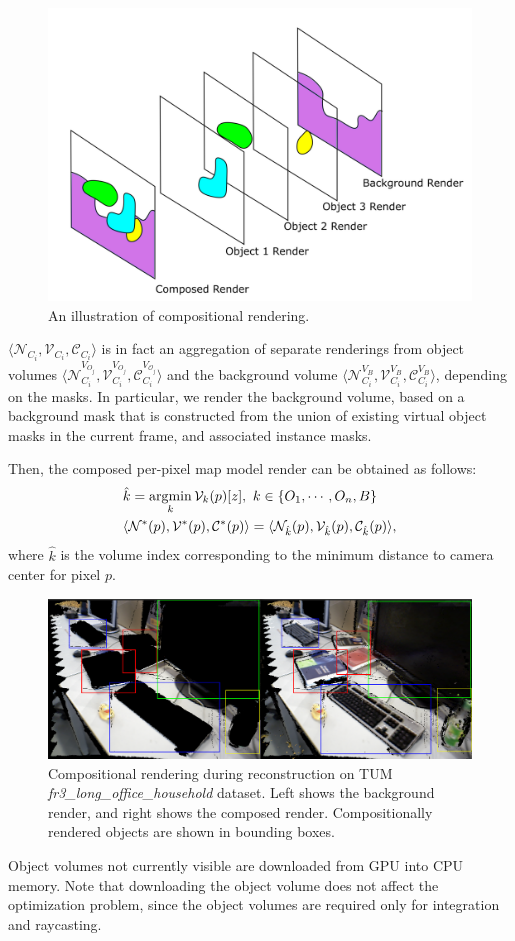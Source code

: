 \begin{figure}[htpb]
    \centering
    \includegraphics[width=0.8\linewidth]{figs/comp-render.png}
    \caption{An illustration of compositional rendering.}%
    \label{fig:comp-render}
\end{figure}

\(\langle \mathcal{N}_{C_i}, \mathcal{V}_{C_i}, \mathcal{C}_{C_i} \rangle \) is in fact an aggregation of separate renderings from object volumes \(\langle \mathcal{N}_{C_i}^{V_{{O}_j}}, \mathcal{V}_{C_i}^{V_{{O}_j}}, \mathcal{C}_{C_i}^{V_{\mathcal{O}_j}} \rangle \) and the background volume \(\langle \mathcal{N}_{C_i}^{V_{B}}, \mathcal{V}_{C_i}^{V_{B}}, \mathcal{C}_{C_i}^{V_{{B}}}  \rangle \), depending on the masks. In particular, we render the background volume, based on a background mask that is constructed from the union of existing virtual object masks in the current frame, and associated instance masks.

Then, the composed per-pixel map model render can be obtained as follows:
\begin{align}
    &\hat{k} = \operatorname*{\arg\!\min}_k \mathcal{V}_k(p)[z], ~k \in \{O_1, \cdots, O_n, B\} \\
    &\langle \mathcal{N}^*(p), \mathcal{V}^*(p), \mathcal{C}^*(p) \rangle = \langle  \mathcal{N}_{\hat{k}}(p), \mathcal{V}_{\hat{k}}(p), \mathcal{C}_{\hat{k}}(p) \rangle,
\end{align}
where $\hat{k}$ is the volume index corresponding to the minimum distance to camera center for pixel $p$.

\begin{figure}[htpb]
    \centering
    \includegraphics[width=\linewidth]{figs/compositional-render.pdf}
    \caption{Compositional rendering during reconstruction on TUM \textit{fr3\_long\_office\_household} dataset. Left shows the background render, and right shows the composed render. Compositionally rendered objects are shown in bounding boxes.}
    \label{fig:compositional_render}
\end{figure}

Object volumes not currently visible are downloaded from GPU into CPU memory. Note that downloading the object volume does not affect the optimization problem, since the object volumes are required only for integration and raycasting.
